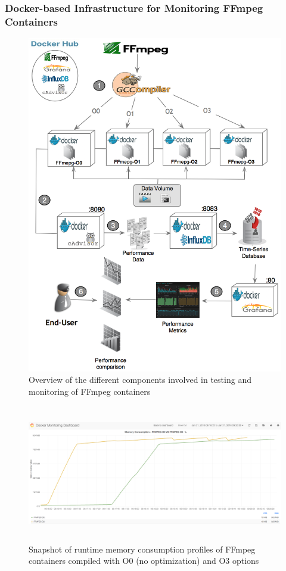 \subsubsection{Docker-based Infrastructure for Monitoring FFmpeg Containers}
\begin{figure}[!b]
	\centering
	\includegraphics[width=1.\linewidth]{Ressources/infra_ffmpeg.png}
	\caption{Overview of the different components involved in testing and monitoring of FFmpeg containers}
\end{figure}
\begin{figure}
	
	\center
	
	\includegraphics[width=15cm,height=6cm]{Ressources/infra_stats.png}
	\caption{Snapshot of runtime memory consumption profiles of FFmpeg containers compiled with O0 (no optimization) and O3 options}
	
	\label{AAA}
	
\end{figure}
